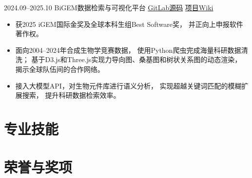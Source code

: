 \documentclass[10pt,a4paper,sans]{moderncv}
\begin{document}
\cventry
  {2024.09--2025.10}
  {BiGEM数据检索与可视化平台}
  {\href{https://gitlab.igem.org/2025/software-tools/bit-china}{GitLab源码}}
  {}
  {\href{https://2025.igem.wiki/bit-china/}{项目Wiki}}
  {
    \begin{itemize}
      \item 获2025 iGEM国际金奖及全球本科生组Best Software奖，
      并正向上申报软件著作权。
      \item 面向2004--2024年合成生物学竞赛数据，
      使用Python爬虫完成海量科研数据清洗；
      基于D3.js和Three.js实现力导向图、桑基图和树状关系图的动态渲染，
      揭示全球队伍间的合作网络。
      \item 接入大模型API，对生物元件库进行语义分析，
      实现超越关键词匹配的模糊扩展搜索，
      提升科研数据检索效率。
    \end{itemize}
  }


\section{专业技能}



\section{荣誉与奖项}


\end{document}
